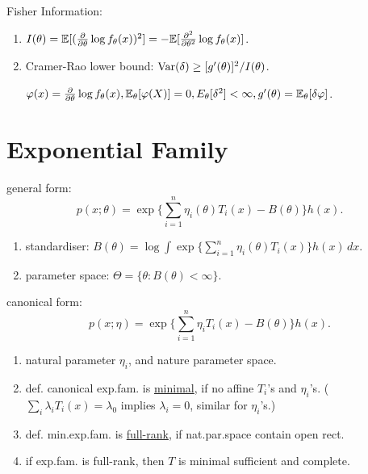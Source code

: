 Fisher Information: \begin{enumerate}[
        leftmargin = 2em,
    ]
    \item $I(\theta) = \mathbb{E}[(\frac{\partial}{\partial\theta} \log f_\theta(x))^2] = -\mathbb{E}[\frac{\partial^2}{\partial\theta^2} \log f_\theta(x)]$.
    \item Cramer-Rao lower bound: $\text{Var}(\delta) \geq [g'(\theta)]^2 / I(\theta)$.
        
        $\varphi(x) = \frac{\partial}{\partial\theta} \log f_\theta(x), 
        \mathbb{E}_\theta[\varphi(X)] = 0, 
        E_\theta[\delta^2] < \infty, 
        g'(\theta) = \mathbb{E}_\theta[\delta\varphi]$.
\end{enumerate}



\section*{Exponential Family}

general form: \vspace{-1ex}
$$p(x; \theta) = \exp\{\sum_{i=1}^n \eta_i(\theta) T_i(x) - B(\theta)\} h(x).$$
\vspace{-1em}\begin{enumerate}[
        leftmargin = 2em,
    ]
    \item standardiser: $B(\theta) = \log \int \exp\{\sum_{i=1}^n \eta_i(\theta) T_i(x)\} h(x) \, dx$.
    \item parameter space: $\Theta = \{\theta\!: B(\theta) < \infty\}$.
\end{enumerate}


canonical form: \vspace{-1ex}
$$p(x; \eta) = \exp\{\sum_{i=1}^n \eta_i T_i(x) - B(\theta)\} h(x).$$
\vspace{-1em}\begin{enumerate}[
        leftmargin = 2em,
    ]
    \item natural parameter $\eta_i$, and nature parameter space.
    \item def. canonical exp.fam. is \underline{minimal}, if no affine $T_i$'s and $\eta_i$'s. 
        \newline ($\sum_i \lambda_i T_i(x) = \lambda_0$ implies $\lambda_i = 0$, similar for $\eta_i$'s.)
    \item def. min.exp.fam. is \underline{full-rank}, if nat.par.space contain open rect.
    \item if exp.fam. is full-rank, then $T$ is minimal sufficient and complete.
\end{enumerate}





